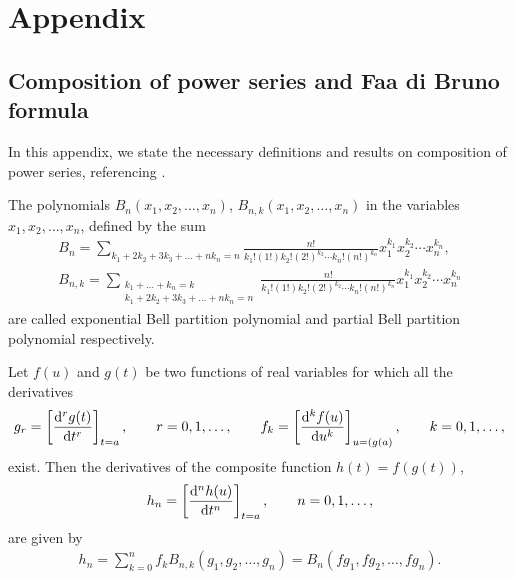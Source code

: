 \appendix
\section{Appendix}


\subsection{Composition of power series and Faa di Bruno formula}

In this appendix, we state the necessary definitions and results on composition of power series, referencing \cite[Chapter~11]{Charalambides}.

\begin{Definition}
The polynomials $B_n(x_1,x_2,\dots,x_n)$, $B_{n,k}(x_1,x_2,\dots,x_n)$ in the variables~${x_1,x_2,\dots,x_n}$, defined by the sum
\begin{gather}
B_{n}=\sum_{ k_1+2k_2+3k_3+\dots +nk_{n}=n} \frac{n!}{k_1!(1!)k_2!(2!)^{k_2}\cdots k_n!(n!)^{k_n}} x_1^{k_1}x_2^{k_2}\cdots x_n^{k_n},\nonumber\\
B_{n,k}=\sum_{\substack{ k_1+\dots +k_n=k\\ k_1+2k_2+3k_3+\dots +nk_{n}=n}} \frac{n!}{k_1!(1!)k_2!(2!)^{k_2}\cdots k_n!(n!)^{k_n}} x_1^{k_1}x_2^{k_2}\cdots x_n^{k_n}\label{Bell polynomials}
\end{gather}
 are called exponential Bell partition polynomial and partial Bell partition polynomial respectively.
\end{Definition}


\begin{Theorem}
Let $f(u)$ and $g(t)$ be two functions of real variables for which all the derivatives
\begin{gather*}
g_r=\left[\frac{{\rm d}^rg(t)}{{\rm d}t^r}\right]_{t=a}, \qquad r=0,1,\dots, \qquad f_k=\left[\frac{{\rm d}^kf(u)}{{\rm d}u^k}\right]_{u=(g(a)}, \qquad k=0,1,\dots,
\end{gather*}
exist. Then the derivatives of the composite function $h(t)= f(g(t))$,
\begin{gather*}
h_n=\left[\frac{{\rm d}^nh(u)}{{\rm d}t^n}\right]_{t=a}, \qquad n=0,1,\dots,
\end{gather*}
are given by
\begin{gather}
h_n=\sum_{k=0}^n f_kB_{n,k}(g_1,g_2,\dots,g_n)=B_n(fg_1,fg_2,\dots,fg_n).\label{Faa di Bruno}
\end{gather}
\end{Theorem}


